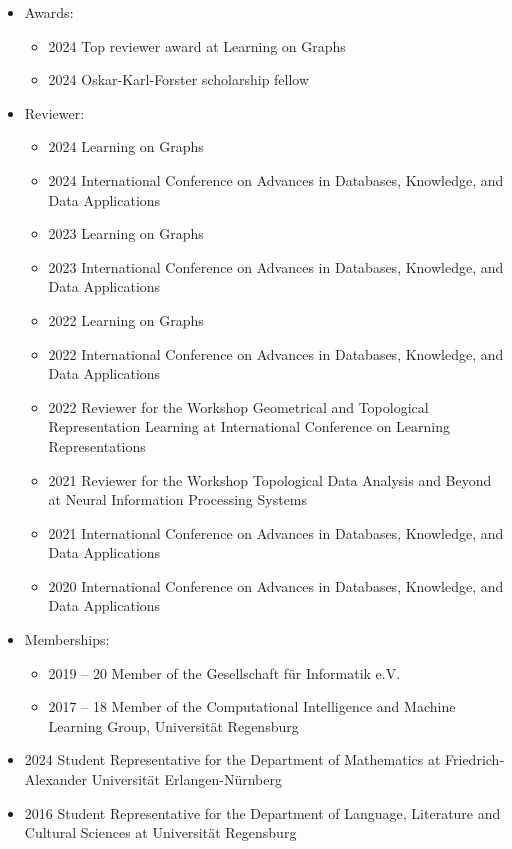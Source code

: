 \documentclass[a4paper, 11pt]{article}
\newcommand{\years}[1]{\marginnote{\scriptsize #1}}
\begin{document}
\years{Service}
\vspace{-10pt}
\begin{itemize}[noitemsep, leftmargin=*]
	\item Awards:
		\begin{itemize}[noitemsep, leftmargin=*]
			\item 2024 Top reviewer award at Learning on Graphs 
			\item 2024 Oskar-Karl-Forster scholarship fellow 
		\end{itemize}
	\item Reviewer:
		\begin{itemize}[noitemsep, leftmargin=*]
			\item 2024 Learning on Graphs 
			\item 2024 International Conference on Advances in Databases, Knowledge, and Data Applications 
			\item 2023 Learning on Graphs 
			\item 2023 International Conference on Advances in Databases, Knowledge, and Data Applications
			\item 2022 Learning on Graphs 
			\item 2022 International Conference on Advances in Databases, Knowledge, and Data Applications 
			\item 2022 Reviewer for the Workshop Geometrical and Topological Representation Learning at International Conference on Learning Representations 
			\item 2021 Reviewer for the Workshop Topological Data Analysis and Beyond at Neural Information Processing Systems 
			\item 2021 International Conference on Advances in Databases, Knowledge, and Data Applications 
			\item 2020 International Conference on Advances in Databases, Knowledge, and Data Applications 
		\end{itemize}
	\item Memberships:
		\begin{itemize}[noitemsep, leftmargin=*]
			\item 2019 -- 20 Member of the Gesellschaft für Informatik e.V. 
			\item 2017 -- 18 Member of the Computational Intelligence and Machine Learning Group, Universität Regensburg 
		\end{itemize}
	\item 2024 Student Representative for the Department of Mathematics at Friedrich-Alexander Universität Erlangen-Nürnberg 
	\item 2016 Student Representative for the Department of Language, Literature and Cultural Sciences at Universität Regensburg 
\end{itemize}
\vspace{10pt}
\end{document}
